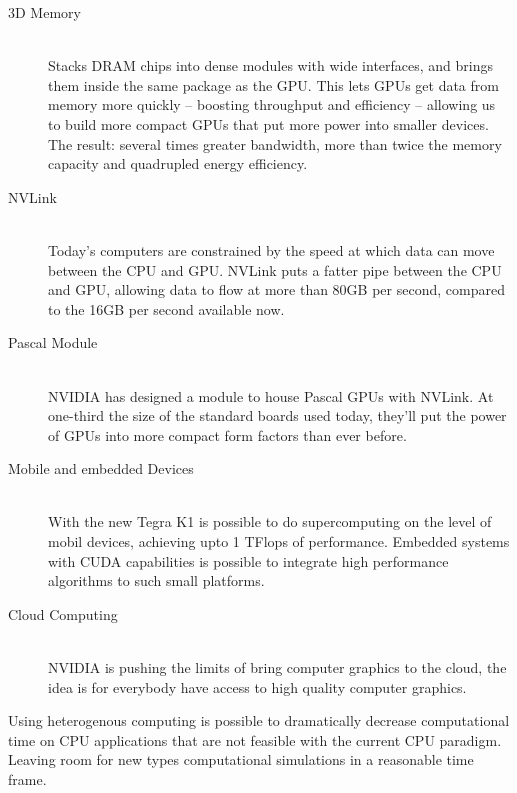 \begin{description}
  \item[3D Memory] \hfill \\
 Stacks DRAM chips into dense modules with wide interfaces, and brings them inside the same package as the GPU. This lets GPUs get data from memory more quickly – boosting throughput and efficiency – allowing us to build more compact GPUs that put more power into smaller devices. The result: several times greater bandwidth, more than twice the memory capacity and quadrupled energy efficiency.
  
  \item[NVLink] \hfill \\
 Today’s computers are constrained by the speed at which data can move between the CPU and GPU. NVLink puts a fatter pipe between the CPU and GPU, allowing data to flow at more than 80GB per second, compared to the 16GB per second available now.
 
 \item[Pascal Module] \hfill \\ 
  NVIDIA has designed a module to house Pascal GPUs with NVLink. At one-third the size of the standard boards used today, they’ll put the power of GPUs into more compact form factors than ever before.
  
   \item[Mobile and embedded Devices] \hfill \\ 
   With the new Tegra K1 is possible to do supercomputing on the level of mobil devices, achieving upto 1 TFlops of performance. Embedded systems with CUDA capabilities is possible to integrate high performance algorithms to such small platforms. 
   \item[Cloud Computing] \hfill \\ 
   NVIDIA is pushing the limits of bring computer graphics to the cloud, the idea is for everybody have access to high quality computer graphics.
 
  \end{description}
  
\vspace{2.5em}


Using heterogenous computing is possible to dramatically decrease computational time on CPU applications that are not feasible with the current CPU paradigm. Leaving room for new types computational simulations in a reasonable time frame.  
